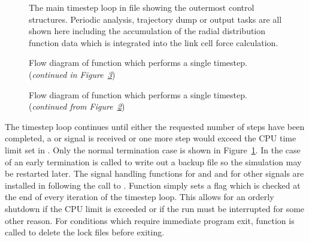 \documentclass[a4paper,twoside]{report}
\begin{document}
\begin{figure}[tb]

\caption[The main timestep loop]{The main timestep loop in file
 showing the outermost control structures.  Periodic
analysis, trajectory dump or output tasks are all shown here including
the accumulation of the radial distribution function data which is
integrated into the link cell force calculation.}
\label{fig:main}
\end{figure}

\begin{figure}[tbp]
\centering

\renewcommand{\thefigure}{\arabic{chapter}.\arabic{figure}(a)}
\caption[Flow  diagram of function  which performs
a single timestep.]{Flow diagram of function  which
  performs a single timestep.  (\emph{continued in
    Figure~\protect\ref{fig:dostep-b}})}
\label{fig:dostep}
\label{fig:dostep-a}
\end{figure}

\addtocounter{figure}{-1}
\begin{figure}[tbp]
\centering

\renewcommand{\thefigure}{\arabic{chapter}.\arabic{figure}(b)}
\caption[Flow  diagram of function  which performs
a single timestep.]{Flow diagram of function  which
  performs a single timestep.  (\emph{continued from
    Figure~\protect\ref{fig:dostep-a}})}
\label{fig:dostep-b}
\end{figure}

The timestep loop continues until either the requested number of steps
have been completed, a  or  signal is
received or one more step would exceed the CPU time limit set in
.  Only the normal termination case is shown
in Figure~\ref{fig:main}.  In the case of an early termination
 is called to write out a backup file so the
simulation may be restarted later.  The signal handling functions
 for  and  and
 for other signals are installed in 
following the call to .  Function 
simply sets a flag which is checked at the end of every iteration of
the timestep loop.  This allows for an orderly shutdown if the CPU
limit is exceeded or if the run must be interrupted for some other
reason. For conditions which require immediate program exit, function
 is called to delete the lock files before exiting.
\end{document}
